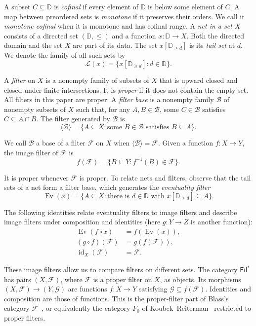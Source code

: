 \documentclass[11pt,a4paper]{article}
\theoremstyle{definition}
\theoremstyle{remark}
\newcommand{\Filp}{\mathsf{Fil}^{*}}
\newcommand{\FF}{\mathcal F}
\newcommand{\GG}{\mathcal G}
\newcommand{\BB}{\mathcal B}
\newcommand{\Ev}{\operatorname{Ev}}
\newcommand{\Tail}{\mathcal L}
\newcommand{\id}{\operatorname{id}}
\begin{document}
A subset \(C\subseteq \mathbb{D}\) is \emph{cofinal} if every element of \(\mathbb{D}\)
is below some element of \(C\). A map between preordered sets is
\emph{monotone} if it preserves their orders. We call it
\emph{monotone cofinal} when it is monotone and has cofinal range.
A \emph{net in a set \(X\)} consists of a directed set
\((\mathbb{D},\le)\) and a function \(x:\mathbb{D}\to X\). Both the
directed domain and the set \(X\) are part of its data. The set
\(x[\mathbb{D}_{\ge d}]\) is its \emph{tail set} at
\(d\). We denote the family of all such sets by
\[
 \Tail(x)=\{x[\mathbb{D}_{\ge d}]:d\in \mathbb{D}\}.
\]

A \emph{filter} on \(X\) is a nonempty family of subsets of \(X\)
that is upward closed and closed under finite intersections. It is
\emph{proper} if it does not contain the empty set. All filters in
this paper are proper. A \emph{filter base} is a nonempty family
\(\BB\) of nonempty subsets of \(X\) such that, for any
\(A,B\in\BB\), some \(C\in\BB\) satisfies \(C\subseteq A\cap B\).
The filter generated by \(\BB\) is
\[
 \langle\BB\rangle=\{A\subseteq X:\text{some }B\in\BB
                                      \text{ satisfies }B\subseteq A\}.
\]

We call \(\BB\) a base of a filter \(\FF\) on \(X\) when
\(\langle\BB\rangle=\FF\). Given a function \(f:X\to Y\), the image
filter of \(\FF\) is
\[
 f(\FF)=\{B\subseteq Y:f^{-1}(B)\in\FF\}.
\]

It is proper whenever \(\FF\) is proper. To relate nets and filters,
observe that the tail sets of a net form a filter base, which generates
the \emph{eventuality filter}
\[
 \Ev(x)=\{A\subseteq X:\text{there is }d\in\mathbb{D}
                  \text{ with }x[\mathbb{D}_{\ge d}]\subseteq A\}.
\]

The following identities relate eventuality filters to image filters
and describe image filters under composition and identities
(here \(g:Y\to Z\) is another function):
\begin{equation}\label{eq:image}
 \begin{aligned}
 \Ev(f\circ x)&=f(\Ev(x)),\\
 (g\circ f)(\FF)&=g(f(\FF)),\\
 \id_X(\FF)&=\FF.
 \end{aligned}
\end{equation}

These image filters allow us to compare filters on different sets.
The category \(\Filp\) has pairs \((X,\FF)\), where \(\FF\) is a
proper filter on \(X\), as objects. Its morphisms
\((X,\FF)\to(Y,\GG)\) are functions \(f:X\to Y\) satisfying
\(\GG\subseteq f(\FF)\). Identities and composition are those of
functions. This is the proper-filter part of Blass's category
\(\mathcal F\)~\cite[Section 1]{Blass}, or equivalently the category
\(F_0\) of Koubek--Reiterman~\cite[p. 19]{KR} restricted to proper
filters.
\end{document}
